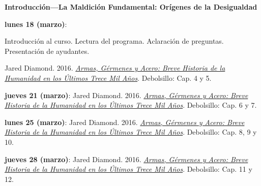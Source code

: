 \documentclass[letterpaper]{article}
\renewenvironment{itemize}{
  \begin{list}{}{
    \setlength{\leftmargin}{1.5em}
  }
}{
  \end{list}
}
\begin{document}
\begin{enumerate}

\item {\bf Introducci\'on---La Maldici\'on Fundamental: Or\'igenes de la Desigualdad}



	\begin{itemize}
		\item {\bf lunes 18 (marzo)}:
      \begin{itemize}
      
        \item[\Pointinghand] Introducci\'on al curso. Lectura del programa. Aclaraci\'on de preguntas. Presentaci\'on de ayudantes.

        \item  Jared Diamond. 2016. \href{https://github.com/hbahamonde/Intro_Ciencias_Sociales/raw/master/Readings/Armas_germenes_acero_Diamond.pdf}{\emph{Armas, G\'ermenes y Acero: Breve Historia de la Humanidad en los \'Ultimos Trece Mil A\~nos}}. Debolsillo: Cap. 4 y 5.

      \end{itemize}
		
		\vspace{0.2cm}
		
		\item {\bf jueves 21 (marzo)}: Jared Diamond. 2016. \href{https://github.com/hbahamonde/Intro_Ciencias_Sociales/raw/master/Readings/Armas_germenes_acero_Diamond.pdf}{\emph{Armas, G\'ermenes y Acero: Breve Historia de la Humanidad en los \'Ultimos Trece Mil A\~nos}}. Debolsillo: Cap. 6 y 7.
		
		\vspace{0.2cm}
		
		\item {\bf lunes 25 (marzo)}: Jared Diamond. 2016. \href{https://github.com/hbahamonde/Intro_Ciencias_Sociales/raw/master/Readings/Armas_germenes_acero_Diamond.pdf}{\emph{Armas, G\'ermenes y Acero: Breve Historia de la Humanidad en los \'Ultimos Trece Mil A\~nos}}. Debolsillo: Cap. 8, 9 y 10.

		\vspace{0.2cm}

		\item {\bf jueves 28 (marzo)}: Jared Diamond. 2016. \href{https://github.com/hbahamonde/Intro_Ciencias_Sociales/raw/master/Readings/Armas_germenes_acero_Diamond.pdf}{\emph{Armas, G\'ermenes y Acero: Breve Historia de la Humanidad en los \'Ultimos Trece Mil A\~nos}}. Debolsillo: Cap. 11 y 12.


\end{itemize}
\end{enumerate}
\end{document}
